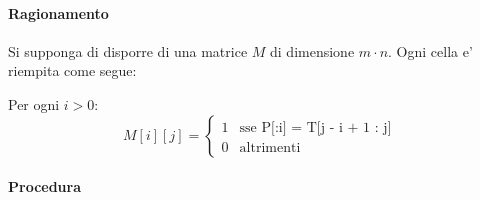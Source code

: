 \paragraph{Ragionamento}

Si supponga di disporre di una matrice $M$ di dimensione $m \cdot n$.
Ogni cella e' riempita come segue:

Per ogni $i > 0$:
\[
    M[i][j] = 
    \begin{cases}
        1 & \text{sse P[:i] = T[j - i + 1 : j]} \\
        0 & \text{altrimenti}
    \end{cases}
\]

\paragraph{Procedura}

\begin{algorithm}
   \renewcommand\thealgorithm{}
   \caption{}
   \begin{algorithmic}
        \Procedure{}{}
        \EndProcedure
    \end{algorithmic}
\end{algorithm}

